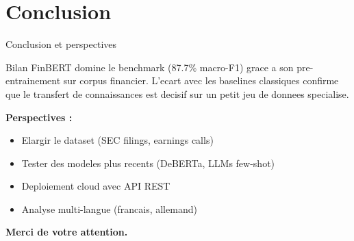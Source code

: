 \documentclass[aspectratio=169, 11pt]{beamer}
\begin{document}
\section{Conclusion}

\begin{frame}{Conclusion et perspectives}
  \begin{block}{Bilan}
    FinBERT domine le benchmark (87.7\% macro-F1) grace a son pre-entrainement
    sur corpus financier. L'ecart avec les baselines classiques confirme que le
    transfert de connaissances est decisif sur un petit jeu de donnees specialise.
  \end{block}
  \vspace{0.3cm}
  \textbf{Perspectives :}
  \begin{itemize}
    \item Elargir le dataset (SEC filings, earnings calls)
    \item Tester des modeles plus recents (DeBERTa, LLMs few-shot)
    \item Deploiement cloud avec API REST
    \item Analyse multi-langue (francais, allemand)
  \end{itemize}
  \vspace{0.5cm}
  \centering\large
  \textbf{Merci de votre attention.}
\end{frame}
\end{document}
